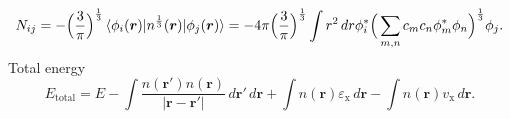 \documentclass[12pt]{article}
\begin{document}
\begin{enumerate}[(a)]
\begin{equation}
              N_{ij} = - \Big( \frac{3}{\pi}\Big)^{\frac{1}{3}}
              \braket{\phi_{i} (\bm{r}) |
                  n^{\frac{1}{3}}(\bm{r})
                  | \phi_{j} (\bm{r})}
              = -4\pi\Big( \frac{3}{\pi}\Big)^{\frac{1}{3}}
              \int r^2 \, d r \phi_{i}^\ast
              \Big(\sum_{m, n} c_m c_n  \phi_{m}^\ast  \phi_{n} \Big)^{\frac{1}{3}}
              \phi_{j}.
          \end{equation}
          Total energy
          \begin{equation}
              E_{\text{total}} = E -
              \int \frac{n(\bm{r}')n(\bm{r})}{\lvert \bm{r} - \bm{r}' \rvert} \, d\bm{r}'\, d\bm{r} +
              \int n(\bm{r}) \varepsilon_{\text{x}}\, d\bm{r} -
              \int n(\bm{r}) v_{\text{x}} \, d\bm{r}.
          \end{equation}

\end{enumerate}
\end{document}
